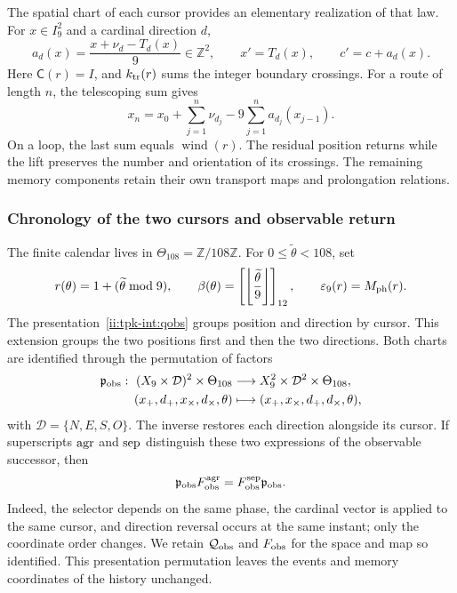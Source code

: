 The spatial chart of each cursor provides an elementary realization of that law. For \(x\in I_9^2\) and a cardinal direction \(d\),
\[
 a_d(x)=\frac{x+\nu_d-T_d(x)}9\in\mathbb Z^2,
 \qquad x'=T_d(x),\qquad c'=c+a_d(x).
\]
Here \(\mathsf C(r)=I\), and \(k_{\rm tr}(r)\) sums the
integer boundary crossings. For a route of length \(n\),
the telescoping sum gives
\[
 x_n=x_0+\sum_{j=1}^n\nu_{d_j}
             -9\sum_{j=1}^n a_{d_j}(x_{j-1}).
\]
On a loop, the last sum equals
\(\operatorname{wind}(r)\). The residual position returns while
the lift preserves the number and orientation of its crossings.
The remaining memory components retain their own transport
maps and prolongation relations.

\subsubsection{Chronology of the two cursors and observable return}

The finite calendar lives in \(\Theta_{108}=\mathbb Z/108\mathbb Z\).
For \(0\leq\widetilde\theta<108\), set
\[
 r(\theta)=1+(\widetilde\theta\bmod9),\qquad
 \beta(\theta)=\left[\left\lfloor\frac{\widetilde\theta}{9}
 \right\rfloor\right]_{12},\qquad
 \varepsilon_9(r)=M_{\rm ph}(r).
\]
The presentation~\eqref{ii:tpk-int:qobs} groups position and direction by cursor. This extension groups the two positions first and then the two directions. Both charts are identified through the permutation of factors
\begin{equation}
 \begin{aligned}
 \mathfrak p_{\rm obs}:\ (X_9\times\mathcal D)^2\times\Theta_{108}
 &\longrightarrow X_9^2\times\mathcal D^2\times\Theta_{108},\\
 (x_+,d_+,x_\times,d_\times,\theta)
 &\longmapsto(x_+,x_\times,d_+,d_\times,\theta),
 \end{aligned}
 \label{ii:ii:permutacion-coordenadas-observables}
\end{equation}
with \(\mathcal D=\{N,E,S,O\}\). The inverse restores each direction alongside
its cursor. If superscripts \({\rm agr}\) and \({\rm sep}\) distinguish
these two expressions of the observable successor, then
\[
 \mathfrak p_{\rm obs}F_{\rm obs}^{\rm agr}
 =F_{\rm obs}^{\rm sep}\mathfrak p_{\rm obs}.
\]
Indeed, the selector depends on the same phase, the cardinal vector is
applied to the same cursor, and direction reversal occurs at the same
instant; only the coordinate order changes. We retain
\(\mathcal Q_{\rm obs}\) and \(F_{\rm obs}\) for the space and
map so identified. This presentation permutation leaves
the events and memory coordinates of the history unchanged.

